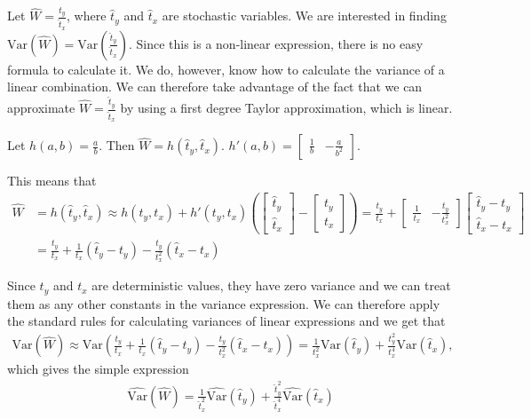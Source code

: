 \documentclass{article}
\begin{document}
\begin{example}
  Let \(\widehat{W} = \frac{\hat{t}_y}{\hat{t}_x}\), where \(\hat{t}_y\) and \(\hat{t}_x\) are stochastic variables. We
  are interested in finding \(\mathrm{Var} \left( \widehat{W} \right) = \mathrm{Var}
  \left( \frac{\hat{t}_y}{\hat{t}_x} \right)\).
  Since this is a non-linear expression, there is no easy formula to calculate
  it. We do, however, know how to calculate the variance of a linear
  combination. We can therefore take advantage of the fact that we can
  approximate \(\widehat{W} = \frac{\hat{t}_y}{\hat{t}_x}\) by using a first degree Taylor approximation,
  which is linear.

  Let \(h(a, b) = \frac{a}{b}\). Then \(\widehat{W} = h(\hat{t}_y, \hat{t}_x)\).
  \(h'(a, b) = \begin{bmatrix} \frac{1}{b} & -\frac{a}{b^2} \end{bmatrix}.\)

  This means that
  \begin{align*}
    \widehat{W} &= h(\hat{t}_y, \hat{t}_x)
    \approx h(t_y, t_x) + h'(t_y, t_x) \left( \begin{bmatrix} \hat{t}_y \\ \hat{t}_x \end{bmatrix}
    - \begin{bmatrix} t_y \\ t_x \end{bmatrix} \right)
    = \frac{t_y}{t_x} + \begin{bmatrix} \frac{1}{t_x} &
    -\frac{t_y}{t_x^2} \end{bmatrix} \begin{bmatrix} \hat{t}_y - t_y \\
      \hat{t}_x - t_x \end{bmatrix} \\
    &= \frac{t_y}{t_x} + \frac{1}{t_x} \left( \hat{t}_y - t_y \right) - \frac{t_y}{t_x^2} \left( \hat{t}_x - t_x \right)
    \end{align*}

    Since \(t_y\) and \(t_x\) are deterministic values, they have zero variance
    and we can treat them as any other constants in the variance expression. We can therefore apply
    the standard rules for calculating variances of linear expressions and we
    get that
    \begin{align*}
      \mathrm{Var} \left( \widehat{W} \right) \approx \mathrm{Var} \left(
      \frac{t_y}{t_x} + \frac{1}{t_x} \left( \hat{t}_y - t_y \right) -
      \frac{t_y}{t_x^2} \left( \hat{t}_x - t_x \right) \right)
    = \frac{1}{t_x^2} \mathrm{Var} \left( \hat{t}_y \right) +
      \frac{t_y^2}{t_x^4} \mathrm{Var} \left( \hat{t}_x \right),
      \end{align*}
      which gives the simple expression \begin{align*}
                    \widehat{\mathrm{Var}} \left( \widehat{W} \right) = \frac{1}{\hat{t}_x^2} \widehat{\mathrm{Var}} \left( \hat{t}_y \right) +
                    \frac{\hat{t}_y^2}{\hat{t}_x^4} \widehat{\mathrm{Var}} \left( \hat{t}_x \right)
                    \end{align*}


\end{example}
\end{document}
